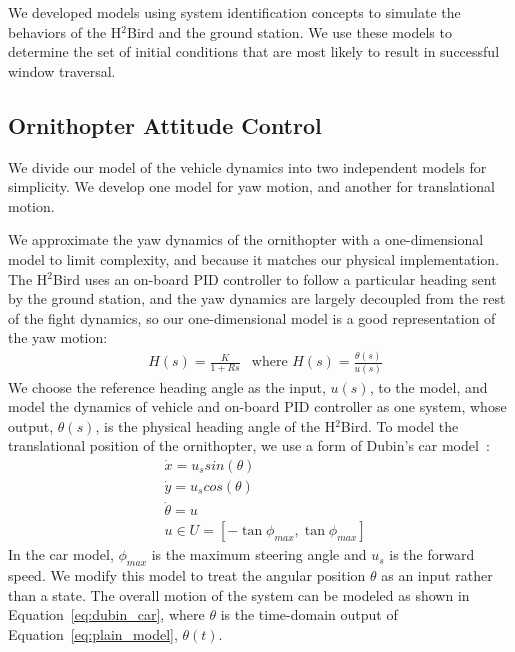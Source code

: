\documentclass{aamas2013}
\begin{document}
We developed models using system identification concepts to simulate the
behaviors of the H$^2$Bird and the ground station. We use these models to
determine the set of initial conditions that are most likely to result in
successful window traversal.

\subsection{Ornithopter Attitude Control}
\label{sec:model_attitude}

We divide our model of the vehicle dynamics into two independent models for 
simplicity. We develop one model for yaw motion, and another for translational motion.

We approximate the yaw dynamics of the ornithopter with a one-dimensional model to 
limit complexity, and because it matches our physical implementation. The H$^2$Bird 
uses an on-board PID controller to follow a particular heading sent by the ground 
station, and the yaw dynamics are largely decoupled from the rest of the fight dynamics, 
so our one-dimensional model is a good representation of the yaw motion:
\begin{equation}
\label{eq:plain_model}
\begin{aligned}
& H(s) = \frac{K}{1 + Rs}
& \text{where }H(s) = \frac{\theta(s)}{u(s)}
\end{aligned}
\end{equation}
We choose the reference heading angle as the input, $u(s)$, to the model, and
model the dynamics of vehicle and on-board PID controller as one system, whose
output, $\theta(s)$, is the physical heading angle of the H$^2$Bird. To model the translational position of
the ornithopter, we use a form of Dubin's car model~\cite{lavalle:planning}:
\begin{equation}
\label{eq:dubin_car}
\begin{aligned}
& \dot{x} = u_{s}sin(\theta)\\
& \dot{y} = u_{s}cos(\theta)\\
& \dot{\theta} = u\\
& u \in U=[-\tan{\phi_{max}},\tan{\phi_{max}}]
\end{aligned}
\end{equation} 
In the car model, $\phi_{max}$ is the maximum steering angle and $u_{s}$ is
the forward speed. We modify this model to treat the angular position $\theta$
as an input rather than a state. The overall motion of the system can be
modeled as shown in Equation~\ref{eq:dubin_car}, where $\theta$ is the
time-domain output of Equation~\ref{eq:plain_model}, $\theta(t)$.
\end{document}
